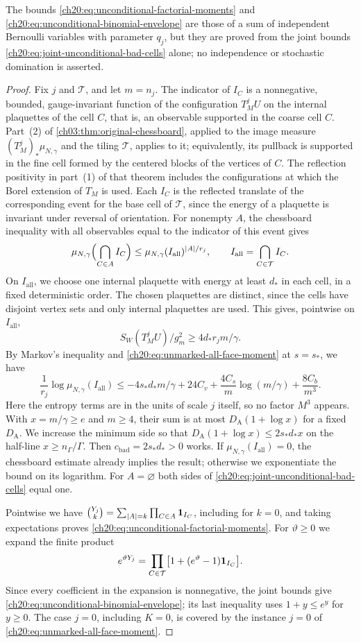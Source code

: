 The bounds \eqref{ch20:eq:unconditional-factorial-moments} and \eqref{ch20:eq:unconditional-binomial-envelope} are those of a sum of independent Bernoulli variables with parameter $q_j$, but they are proved from the joint bounds \eqref{ch20:eq:joint-unconditional-bad-cells} alone; no independence or stochastic domination is asserted.

\begin{proof}
Fix $j$ and $\mathcal T$, and let $m=n_j$. The indicator of $I_C$ is a nonnegative, bounded, gauge-invariant function of the configuration $T_M^jU$ on the internal plaquettes of the cell $C$, that is, an observable supported in the coarse cell $C$. Part~(2) of \cref{ch03:thm:original-chessboard}, applied to the image measure $(T_M^j)_*\mu_{N,\gamma}$ and the tiling $\mathcal T$, applies to it; equivalently, its pullback is supported in the fine cell formed by the centered blocks of the vertices of $C$. The reflection positivity in part~(1) of that theorem includes the configurations at which the Borel extension of $T_M$ is used. Each $I_C$ is the reflected translate of the corresponding event for the base cell of $\mathcal T$, since the energy of a plaquette is invariant under reversal of orientation. For nonempty $A$, the chessboard inequality with all observables equal to the indicator of this event gives
\[
 \mu_{N,\gamma}\Bigl(\bigcap_{C\in A}I_C\Bigr)\le\mu_{N,\gamma}(I_{\mathrm{all}})^{\lvert A\rvert/r_j},\qquad
 I_{\mathrm{all}}=\bigcap_{C\in\mathcal T}I_C.
\]
On $I_{\mathrm{all}}$, we choose one internal plaquette with energy at least $d_*$ in each cell, in a fixed deterministic order. The chosen plaquettes are distinct, since the cells have disjoint vertex sets and only internal plaquettes are used. This gives, pointwise on $I_{\mathrm{all}}$,
\[
 S_W(T_M^jU)/g_m^2\ge4d_*r_jm/\gamma.
\]
By Markov's inequality and \eqref{ch20:eq:unmarked-all-face-moment} at $s=s_*$, we have
\[
 \frac1{r_j}\log\mu_{N,\gamma}(I_{\mathrm{all}})
 \le-4s_*d_*m/\gamma+24C_v+\frac{4C_s}{m}\log(m/\gamma)+\frac{8C_b}{m^3}.
\]
Here the entropy terms are in the units of scale $j$ itself, so no factor $M^3$ appears. With $x=m/\gamma\ge e$ and $m\ge4$, their sum is at most $D_{\mathrm A}(1+\log x)$ for a fixed $D_{\mathrm A}$. We increase the minimum side so that $D_{\mathrm A}(1+\log x)\le2s_*d_*x$ on the half-line $x\ge n_\Gamma/\Gamma$. Then $c_{\mathrm{bad}}=2s_*d_*>0$ works. If $\mu_{N,\gamma}(I_{\mathrm{all}})=0$, the chessboard estimate already implies the result; otherwise we exponentiate the bound on its logarithm. For $A=\varnothing$ both sides of \eqref{ch20:eq:joint-unconditional-bad-cells} equal one.

Pointwise we have $\binom{Y_j}{k}=\sum_{\lvert A\rvert=k}\prod_{C\in A}\mathbf 1_{I_C}$, including for $k=0$, and taking expectations proves \eqref{ch20:eq:unconditional-factorial-moments}. For $\vartheta\ge0$ we expand the finite product
\[
 e^{\vartheta Y_j}=\prod_{C\in\mathcal T}\bigl[1+(e^\vartheta-1)\mathbf 1_{I_C}\bigr].
\]
Since every coefficient in the expansion is nonnegative, the joint bounds give \eqref{ch20:eq:unconditional-binomial-envelope}; its last inequality uses $1+y\le e^y$ for $y\ge0$. The case $j=0$, including $K=0$, is covered by the instance $j=0$ of \eqref{ch20:eq:unmarked-all-face-moment}.
\end{proof}

